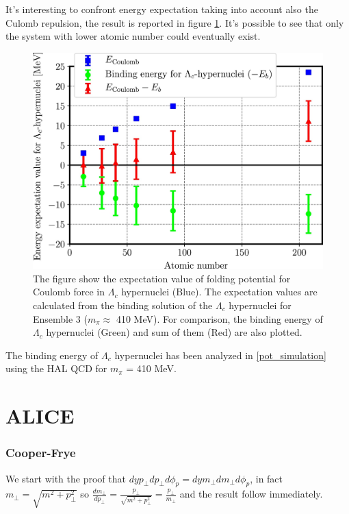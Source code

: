 \documentclass[12pt,a4paper]{book}
\begin{document}
	It's interesting to confront energy expectation taking into account also the Culomb repulsion, the result is reported in figure \ref{fig:binding_culomb}. It's possible to see that only the system with lower atomic number could eventually exist.
	
	\begin{figure}
		\centering
		\includegraphics[width=0.74 \linewidth]{pictures/binding_culomb.jpg}
		\caption{The figure show the expectation value of folding potential for Coulomb force in $\Lambda_c$ hypernuclei (Blue). The expectation values are calculated from the binding solution of the $\Lambda_c$ hypernuclei for Ensemble 3 ($m_\pi \approx$ 410 MeV). For comparison, the binding energy of $\Lambda_c$ hypernuclei (Green) and sum of them (Red) are also plotted.}
		\label{fig:binding_culomb}
	\end{figure}
	
	
	
	
	The binding energy of $\Lambda_c$ hypernuclei has been analyzed in \ref{pot_simulation} using the HAL QCD for $m_\pi$ = 410 MeV. 
	
	\FloatBarrier
	
	\newpage
	
	\chapter{ALICE}
	
	\appendix
	\subsection{Cooper-Frye}
	We start with the proof that $dy p_\perp dp_\perp d\phi_p = dy m_\perp dm_\perp d\phi_p$, in fact $m_\perp=\sqrt{m^2 + p_\perp^2}$ so $\frac{dm_\perp}{dp_\perp}= \frac{p_\perp}{\sqrt{m^2 + p_\perp^2}} = \frac{p_\perp}{m_\perp}$ and the result follow immediately.
	
\end{document}
